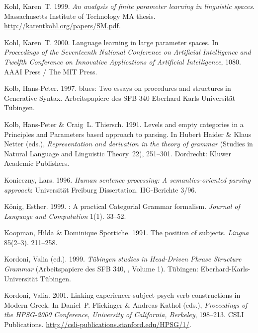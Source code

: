 \begin{thebibliography}{1420}
Kohl, Karen~T. 1999.
\newblock \emph{An analysis of finite parameter learning in linguistic spaces}.
\newblock Massachusetts Institute of Technology MA thesis.
\newblock \urlprefix\url{http://karentkohl.org/papers/SM.pdf}.

Kohl, Karen~T. 2000.
\newblock Language learning in large parameter spaces.
\newblock In \emph{Proceedings of the {Seventeenth National Conference on
  Artificial Intelligence and Twelfth Conference on Innovative Applications of
  Artificial Intelligence}}, 1080. AAAI Press / The MIT Press.

Kolb, Hans-Peter. 1997.
 blues: {Two} essays on procedures and structures in {Generative
  Syntax}.
\newblock Arbeitspapiere des SFB 340 
  Eberhard-Karls-Uni\-ver\-si\-t{\"a}t T{\"u}bingen.

Kolb, Hans-Peter \& Craig~L. Thiersch. 1991.
\newblock Levels and empty categories in a {Principles and Parameters} based
  approach to parsing.
\newblock In Hubert Haider \& Klaus Netter (eds.), \emph{Representation and
  derivation in the theory of grammar} (Studies in Natural Language and
  Linguistic Theory~22), 251--301. Dordrecht: Kluwer Academic Publishers.

Konieczny, Lars. 1996.
\newblock \emph{Human sentence processing: {A} semantics-oriented parsing
  approach}: Universit{\"a}t Freiburg Dissertation.
\newblock IIG-Berichte 3/96.

K{\"o}nig, Esther. 1999.
: {A} practical {Categorial Grammar} formalism.
\newblock \emph{Journal of Language and Computation} 1(1). 33--52.

Koopman, Hilda \& Dominique Sportiche. 1991.
\newblock The position of subjects.
\newblock \emph{Lingua} 85(2--3). 211--258.

Kordoni, Valia (ed.). 1999.
\newblock \emph{T{\"u}bingen studies in {Head-Driven Phrase Structure Grammar}}
   ({Arbeitspapiere des SFB 340, , Volume 1}).
\newblock T\"u\-bing\-en: Eberhard-Karls-Universit{\"a}t T{\"u}bingen.

Kordoni, Valia. 2001.
\newblock Linking experiencer-subject psych verb constructions in {Modern
  Greek}.
\newblock In Daniel~P. Flickinger \& Andreas Kathol (eds.), \emph{Proceedings
  of the {HPSG-2000 Conference, University of California, Berkeley}}, 198--213.
  CSLI Publications.
\newblock \urlprefix\url{http://csli-publications.stanford.edu/HPSG/1/}.


\end{thebibliography}
